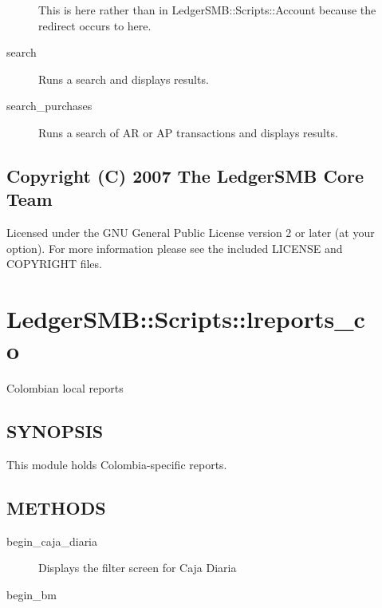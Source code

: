 \begin{description}
\begin{description}
This is here rather than in LedgerSMB::Scripts::Account because the redirect
occurs to here.


\item[{search}] \mbox{}

Runs a search and displays results.


\item[{search\_purchases}] \mbox{}

Runs a search of AR or AP transactions and displays results.

\end{description}
\subsection*{Copyright (C) 2007 The LedgerSMB Core Team\label{LedgerSMB::Scripts::journal_Copyright_C_2007_The_LedgerSMB_Core_Team}}


Licensed under the GNU General Public License version 2 or later (at your 
option).  For more information please see the included LICENSE and COPYRIGHT 
files.

\section{LedgerSMB::Scripts::lreports\_co\label{LedgerSMB::Scripts::lreports_co}}


Colombian local reports

\subsection*{SYNOPSIS\label{LedgerSMB::Scripts::lreports_co_SYNOPSIS}}


This module holds Colombia-specific reports.

\subsection*{METHODS\label{LedgerSMB::Scripts::lreports_co_METHODS}}
\begin{description}

\item[{begin\_caja\_diaria}] \mbox{}

Displays the filter screen for Caja Diaria


\item[{begin\_bm}] \mbox{}


\end{description}
\end{description}
